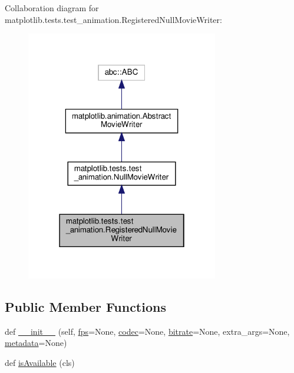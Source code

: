 Collaboration diagram for matplotlib.\+tests.\+test\+\_\+animation.\+Registered\+Null\+Movie\+Writer\+:
\nopagebreak
\begin{figure}[H]
\begin{center}
\leavevmode
\includegraphics[width=238pt]{classmatplotlib_1_1tests_1_1test__animation_1_1RegisteredNullMovieWriter__coll__graph}
\end{center}
\end{figure}
\subsection*{Public Member Functions}
\begin{DoxyCompactItemize}
\item 
def \hyperlink{classmatplotlib_1_1tests_1_1test__animation_1_1RegisteredNullMovieWriter_a85a0b5904a396277c977ecf2121dfc61}{\+\_\+\+\_\+init\+\_\+\+\_\+} (self, \hyperlink{classmatplotlib_1_1animation_1_1AbstractMovieWriter_aaf7656da4e1f760b64f453cffbe15a82}{fps}=None, \hyperlink{classmatplotlib_1_1animation_1_1AbstractMovieWriter_a0f1f647083b08f59de77ec4a3692e465}{codec}=None, \hyperlink{classmatplotlib_1_1animation_1_1AbstractMovieWriter_a8437f6e4c409bdd6392b1d354e9bc4c5}{bitrate}=None, extra\+\_\+args=None, \hyperlink{classmatplotlib_1_1animation_1_1AbstractMovieWriter_a5a23958781c90f0aae7ac29ef6a7401f}{metadata}=None)
\item 
def \hyperlink{classmatplotlib_1_1tests_1_1test__animation_1_1RegisteredNullMovieWriter_a5f0980221f76c885114d883bb89ad958}{is\+Available} (cls)
\end{DoxyCompactItemize}
